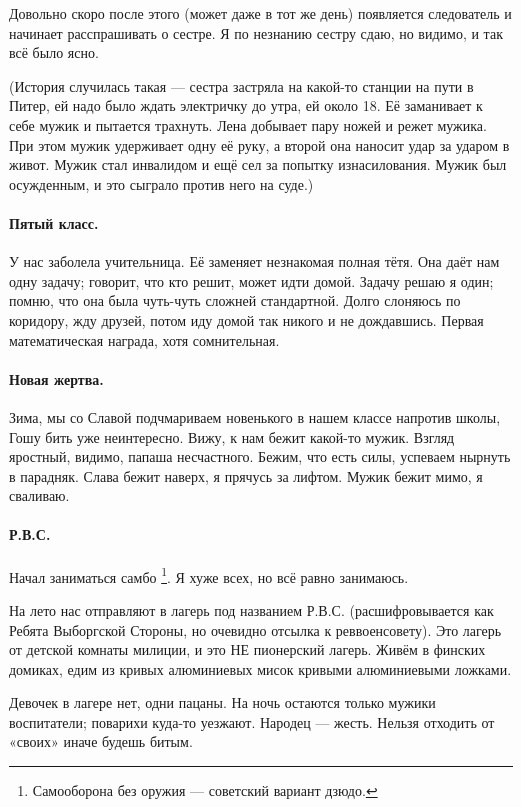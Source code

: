 \documentclass{book}
\begin{document}
Довольно скоро после этого (может даже в тот же день) появляется следователь и начинает расспрашивать о сестре. 
Я по незнанию сестру сдаю, но видимо, и так всё было ясно.

(История случилась такая --- сестра застряла на какой-то станции на пути в Питер, ей надо было ждать электричку до утра, ей около 18.
Её заманивает к себе мужик и пытается трахнуть.
Лена добывает пару ножей и режет мужика.
При этом мужик удерживает одну её руку, а второй она наносит удар за ударом в живот.
Мужик стал инвалидом и ещё сел за попытку изнасилования.
Мужик был осужденным, и это сыграло против него на суде.)

\paragraph{Пятый класс.}
У нас заболела учительница.
Её заменяет незнакомая полная тётя.
Она даёт нам одну задачу; говорит, что кто решит, может идти домой.
Задачу решаю я один; помню, что она была чуть-чуть сложней стандартной.
Долго слоняюсь по коридору, жду друзей, 
потом иду домой так никого и не дождавшись.
Первая математическая награда, хотя сомнительная.

\paragraph{Новая жертва.}
Зима, мы со Славой подчмариваем новенького в нашем классе напротив школы,
Гошу бить уже неинтересно.
Вижу, к нам бежит какой-то мужик. 
Взгляд яростный, видимо, папаша несчастного.
Бежим, что есть силы, успеваем нырнуть в парадняк.
Слава бежит наверх, я прячусь за лифтом.
Мужик бежит мимо, я сваливаю.

\paragraph{Р.В.С.}
Начал заниматься самбо%
\footnote{Самооборона без оружия --- советский вариант дзюдо.}.
Я хуже всех, но всё равно занимаюсь.

На лето нас отправляют в лагерь под названием Р.В.С. (расшифровывается как Ребята Выборгской Стороны, но очевидно отсылка к реввоенсовету).
Это лагерь от детской комнаты милиции,
и это НЕ пионерский лагерь.
Живём в финских домиках, 
едим из кривых алюминиевых мисок кривыми алюминиевыми ложками.

Девочек в лагере нет, одни пацаны.
На ночь остаются только мужики воспитатели;
поварихи куда-то уезжают.
Народец --- жесть.
Нельзя отходить от «своих» иначе будешь битым.
\end{document}
